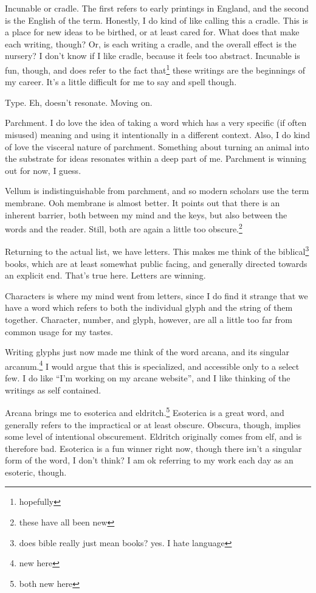 \documentclass[12pt]{article}
\newcommand{\say}[1]{``#1''}
\renewcommand{\,}{\textsuperscript{,}}
\begin{document}
Incunable or cradle.  
The first refers to early printings in England, and the second is the English of the term.  
Honestly, I do kind of like calling this a cradle.  
This is a place for new ideas to be birthed, or at least cared for.  
What does that make each writing, though?  
Or, is each writing a cradle, and the overall effect is the nursery?  
I don't know if I like cradle, because it feels too abstract.  
Incunable is fun, though, and does refer to the fact that\footnote{hopefully} these writings are the beginnings of my career.  
It's a little difficult for me to say and spell though.

Type.  
Eh, doesn't resonate.  
Moving on.

Parchment.  
I do love the idea of taking a word which has a very specific (if often misused) meaning and using it intentionally in a different context.  
Also, I do kind of love the visceral nature of parchment.  
Something about turning an animal into the substrate for ideas resonates within a deep part of me.  
Parchment is winning out for now, I guess.

Vellum is indistinguishable from parchment, and so modern scholars use the term membrane.  
Ooh membrane is almost better.  
It points out that there is an inherent barrier, both between my mind and the keys, but also between the words and the reader.  
Still, both are again a little too obscure.\footnote{these have all been new}

Returning to the actual list, we have letters.  
This makes me think of the biblical\footnote{does bible really just mean books? yes. I hate language} books, which are at least somewhat public facing, and generally directed towards an explicit end.  
That's true here.  
Letters are winning.

Characters is where my mind went from letters, since I do find it strange that we have a word which refers to both the individual glyph and the string of them together.  
Character, number, and glyph, however, are all a little too far from common usage for my tastes.

Writing glyphs just now made me think of the word arcana, and its singular arcanum.\footnote{new here}  
I would argue that this is specialized, and accessible only to a select few.  
I do like \say{I'm working on my arcane website}, and I like thinking of the writings as self contained.

Arcana brings me to esoterica and eldritch.\footnote{both new here}  
Esoterica is a great word, and generally refers to the impractical or at least obscure.  
Obscura, though, implies some level of intentional obscurement.  
Eldritch originally comes from elf, and is therefore bad.  
Esoterica is a fun winner right now, though there isn't a singular form of the word, I don't think?  
I am ok referring to my work each day as an esoteric, though.
\end{document}
